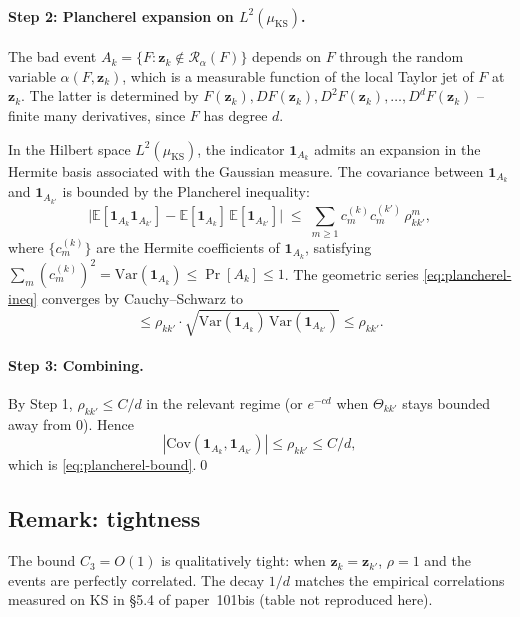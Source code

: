\documentclass[11pt,a4paper]{article}
\begin{document}
\paragraph{Step 2: Plancherel expansion on $L^{2}(\mu_{\mathrm{KS}})$.}

The bad event $A_k = \{F : \mathbf z_k \notin \mathcal R_\alpha(F)\}$ depends on $F$ through the random variable $\alpha(F, \mathbf z_k)$, which is a measurable function of the local Taylor jet of $F$ at $\mathbf z_k$. The latter is determined by $F(\mathbf z_k), DF(\mathbf z_k), D^2 F(\mathbf z_k), \dots, D^d F(\mathbf z_k)$ -- finite many derivatives, since $F$ has degree $d$.

In the Hilbert space $L^2(\mu_{\mathrm{KS}})$, the indicator $\mathbf 1_{A_k}$ admits an expansion in the Hermite basis associated with the Gaussian measure. The covariance between $\mathbf 1_{A_k}$ and $\mathbf 1_{A_{k'}}$ is bounded by the Plancherel inequality:
\begin{equation}\label{eq:plancherel-ineq}
\bigl|\mathbb{E}[\mathbf 1_{A_k}\mathbf 1_{A_{k'}}] - \mathbb{E}[\mathbf 1_{A_k}]\,\mathbb{E}[\mathbf 1_{A_{k'}}]\bigr|
\;\le\;
\sum_{m \ge 1} c_m^{(k)} c_m^{(k')} \, \rho_{kk'}^{m},
\end{equation}
where $\{c_m^{(k)}\}$ are the Hermite coefficients of $\mathbf 1_{A_k}$, satisfying $\sum_m (c_m^{(k)})^2 = \mathrm{Var}(\mathbf 1_{A_k}) \le \Pr[A_k] \le 1$. The geometric series \eqref{eq:plancherel-ineq} converges by Cauchy--Schwarz to
\begin{equation*}
\le \rho_{kk'} \cdot \sqrt{\mathrm{Var}(\mathbf 1_{A_k})\,\mathrm{Var}(\mathbf 1_{A_{k'}})} \le \rho_{kk'}.
\end{equation*}

\paragraph{Step 3: Combining.}
By Step 1, $\rho_{kk'} \le C/d$ in the relevant regime (or $e^{-cd}$ when $\Theta_{kk'}$ stays bounded away from $0$). Hence
$$
|\mathrm{Cov}(\mathbf 1_{A_k}, \mathbf 1_{A_{k'}})| \le \rho_{kk'} \le C/d,
$$
which is \eqref{eq:plancherel-bound}.\qed

\subsection{Remark: tightness}
The bound $C_3 = O(1)$ is qualitatively tight: when $\mathbf z_k = \mathbf z_{k'}$, $\rho = 1$ and the events are perfectly correlated. The decay $1/d$ matches the empirical correlations measured on KS in \S5.4 of paper~101bis (table not reproduced here).
\end{document}

